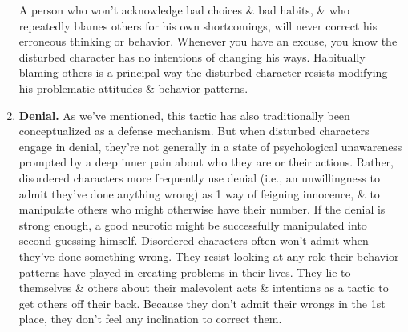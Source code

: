 \documentclass{article}
\numberwithin{equation}{section}
\begin{document}
\begin{enumerate}
	A person who won't acknowledge bad choices \& bad habits, \& who repeatedly blames others for his own shortcomings, will never correct his erroneous thinking or behavior. Whenever you have an excuse, you know the disturbed character has no intentions of changing his ways. Habitually blaming others is a principal way the disturbed character resists modifying his problematic attitudes \& behavior patterns.
	\item \textbf{Denial.} As we've mentioned, this tactic has also traditionally been conceptualized as a defense mechanism. But when disturbed characters engage in denial, they're not generally in a state of psychological unawareness prompted by a deep inner pain about who they are or their actions. Rather, disordered characters more frequently use denial (i.e., an unwillingness to admit they've done anything wrong) as 1 way of feigning innocence, \& to manipulate others who might otherwise have their number. If the denial is strong enough, a good neurotic might be successfully manipulated into second-guessing himself. Disordered characters often won't admit when they've done something wrong. They resist looking at any role their behavior patterns have played in creating problems in their lives. They lie to themselves \& others about their malevolent acts \& intentions as a tactic to get others off their back. Because they don't admit their wrongs in the 1st place, they don't feel any inclination to correct them.
	

\end{enumerate}
\end{document}
